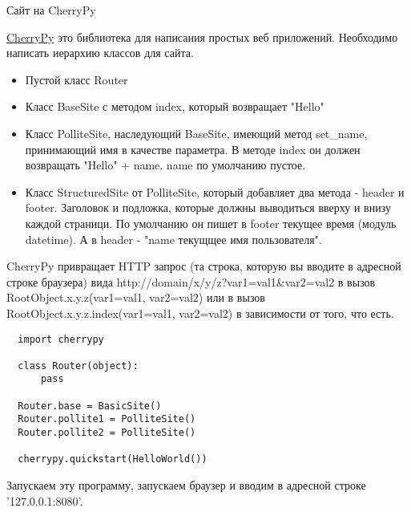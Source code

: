 \documentclass{article}
\begin{document}
\newpage

\begin{center}Сайт на CherryPy\end{center}
\href{http://www.cherrypy.org/}{CherryPy} это библиотека для написания простых веб приложений.
Необходимо написать иерархию классов для сайта. 
\begin{itemize}
    \item Пустой класс Router
    \item Класс BaseSite с методом index, который возвращает "Hello"
    \item Класс PolliteSite, наследующий BaseSite, имеющий метод set\_name,
            принимающий имя в качестве параметра.
            В методе index он должен возвращать "Hello" + name. name по умолчанию пустое.
    \item Класс StructuredSite от PolliteSite, который добавляет два метода - header и footer.
          Заголовок и подложка, которые должны выводиться вверху и внизу каждой страници.
          По умолчанию он пишет в footer текущее время (модуль datetime). А в header - 
          "name {текущщее имя пользователя}".

\end{itemize}

CherryPy привращает HTTP запрос (та строка, которую вы вводите в адресной строке браузера)
вида http://domain/x/y/z?var1=val1\&var2=val2
в вызов RootObject.x.y.z(var1=val1, var2=val2) или в вызов \\
RootObject.x.y.z.index(var1=val1, var2=val2) в зависимости от того, что есть.

\begin{lstlisting}
  import cherrypy

  class Router(object):
      pass

  Router.base = BasicSite()
  Router.pollite1 = PolliteSite()
  Router.pollite2 = PolliteSite()

  cherrypy.quickstart(HelloWorld())
\end{lstlisting}

Запускаем эту программу, запускаем браузер и вводим в адресной строке '127.0.0.1:8080'.

\newpage
\end{document}
